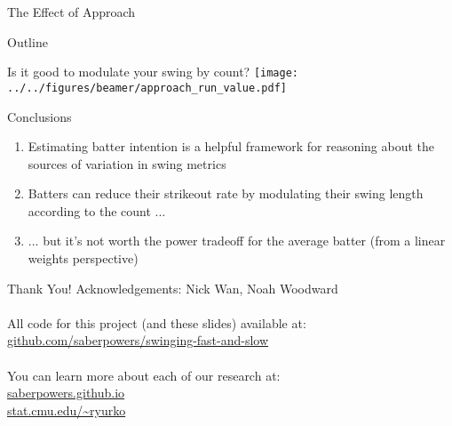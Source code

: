 \documentclass{beamer}
\begin{document}
\begin{frame}{The Effect of Approach}
\end{frame}

\begin{frame}{Outline}
\end{frame}

\begin{frame}{Is it good to modulate your swing by count?}
  \centering
  \texttt{[image: ../../figures/beamer/approach\_run\_value.pdf]}
\end{frame}

\begin{frame}{Conclusions}
  \begin{enumerate}
    \item Estimating batter \alert{intention} is a helpful framework for reasoning about the sources of variation in swing metrics
    \item Batters can reduce their strikeout rate by modulating their swing length according to the count ...
    \item ... but it's not worth the power tradeoff for the average batter (from a linear weights perspective)
  \end{enumerate}
\end{frame}

\begin{frame}{Thank You!}
  Acknowledgements: Nick Wan, Noah Woodward\\
  ~\\
  All code for this project (and these slides) available at:\\
  \alert{\url{github.com/saberpowers/swinging-fast-and-slow}}\\
  ~\\
  You can learn more about each of our research at:\\
  \alert{
    \url{saberpowers.github.io}\\
    \url{stat.cmu.edu/~ryurko}
  }
\end{frame}
\end{document}
